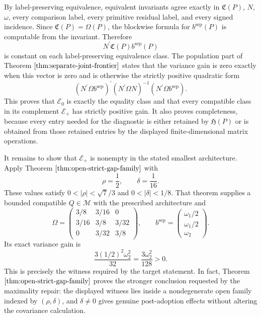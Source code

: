 By label-preserving equivalence, equivalent invariants agree exactly in \(\mathfrak C(P)\), \(N\), \(\omega\), every comparison label, every primitive residual label, and every signed incidence. Since \(\mathfrak C(P)=\Omega(P)\), the blockwise formula for \(b^{\mathrm{sep}}(P)\) is computable from the invariant. Therefore
\[
N^{\prime}\mathfrak C(P)b^{\mathrm{sep}}(P)
\]
is constant on each label-preserving equivalence class. The population part of Theorem \(\ref{thm:separate-joint-frontier}\) states that the variance gain is zero exactly when this vector is zero and is otherwise the strictly positive quadratic form
\[
(N^{\prime}\Omega b^{\mathrm{sep}})^{\prime}
(N^{\prime}\Omega N)^{-1}
(N^{\prime}\Omega b^{\mathrm{sep}}).
\]
This proves that \(\mathscr E_0\) is exactly the equality class and that every compatible class in its complement \(\mathscr E_+\) has strictly positive gain. It also proves completeness, because every entry needed for the diagnostic is either retained by \(\mathfrak H(P)\) or is obtained from those retained entries by the displayed finite-dimensional matrix operations.

It remains to show that \(\mathscr E_+\) is nonempty in the stated smallest architecture. Apply Theorem \(\ref{thm:open-strict-gap-family}\) with
\[
\rho=\frac12,
\qquad
\delta=\frac1{16}.
\]
These values satisfy \(0<|\rho|<\sqrt7/3\) and \(0<|\delta|<1/8\). That theorem supplies a bounded compatible \(Q\in\mathcal M\) with the prescribed architecture and
\[
\Omega=
\begin{pmatrix}
3/8&3/16&0\\
3/16&3/8&3/32\\
0&3/32&3/8
\end{pmatrix},
\qquad
b^{\mathrm{sep}}=
\begin{pmatrix}\omega_1/2\\ \omega_1/2\\ \omega_2\end{pmatrix}.
\]
Its exact variance gain is
\[
\frac{3(1/2)^2\omega_2^2}{32}
=\frac{3\omega_2^2}{128}>0.
\]
This is precisely the witness required by the target statement. In fact, Theorem \(\ref{thm:open-strict-gap-family}\) proves the stronger conclusion requested by the maximality repair: the displayed witness lies inside a nondegenerate open family indexed by \((\rho,\delta)\), and \(\delta\ne0\) gives genuine post-adoption effects without altering the covariance calculation.